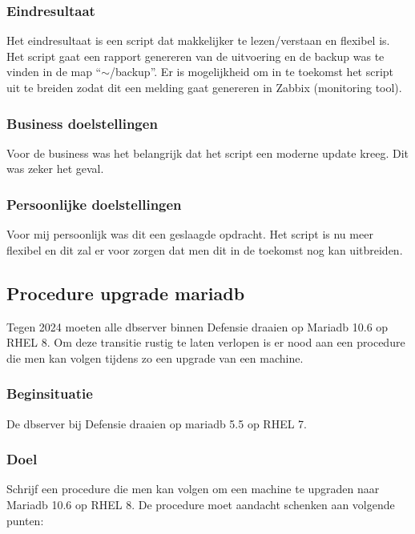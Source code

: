 \subsubsection{Eindresultaat}

Het eindresultaat is een script dat makkelijker te lezen/verstaan en flexibel is. Het script gaat een rapport genereren van de uitvoering en de backup was te vinden in de map ``$\sim$/backup''. Er is mogelijkheid om in te toekomst het script uit te breiden zodat dit een melding gaat genereren in Zabbix (monitoring tool).

\subsubsection{Business doelstellingen}

Voor de business was het belangrijk dat het script een moderne update kreeg. Dit was zeker het geval.

\subsubsection{Persoonlijke doelstellingen}

Voor mij persoonlijk was dit een geslaagde opdracht. Het script is nu meer flexibel en dit zal er voor zorgen dat men dit in de toekomst nog kan uitbreiden.


\subsection{Procedure upgrade mariadb}

Tegen 2024 moeten alle dbserver binnen Defensie draaien op Mariadb 10.6 op RHEL 8. Om deze transitie rustig te laten verlopen is er nood aan een procedure die men kan volgen tijdens zo een upgrade van een machine.

\subsubsection{Beginsituatie}

De dbserver bij Defensie draaien op mariadb 5.5 op RHEL 7.

\subsubsection{Doel}

Schrijf een procedure die men kan volgen om een machine te upgraden naar Mariadb 10.6 op RHEL 8. De procedure moet aandacht schenken aan volgende punten:

